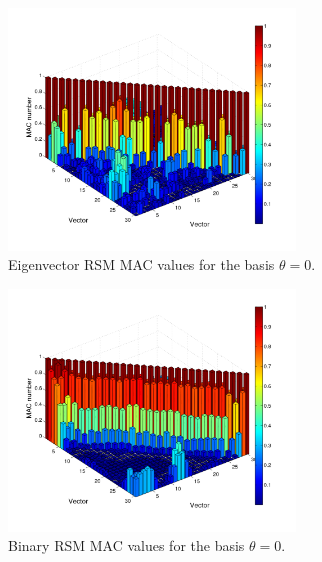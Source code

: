 \documentclass[3p,times]{elsarticle}
\begin{document}
\begin{figure}[ht!]
\includegraphics[width={3.0in}]{../figs/EVMAC.pdf}
\centering
\caption{Eigenvector RSM MAC values for the basis $\theta=0$.}
\label{fig:EMAC}
\end{figure}

\begin{figure}[ht!]
\includegraphics[width={3.0in}]{../figs/BiMAC.pdf}
\centering
\caption{Binary RSM MAC values for the basis $\theta=0$.}
\label{fig:BMAC}
\end{figure}
\end{document}
